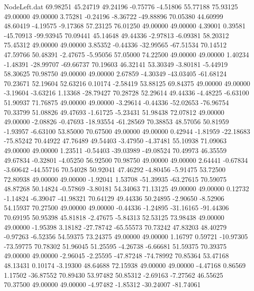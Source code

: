 \begin{filecontents}{NodeLeft.dat}
  69.98251   45.24719   49.24196    -0.75776   -4.51806   55.77188   75.93125   49.00000   49.00000    3.75281   -0.24196   -8.36722  -49.88896
  70.05380   44.60999   48.60419    -4.19575   -9.17368   57.23125   76.01250   49.00000   49.00000    4.39001    0.39581  -45.70913  -99.93945
  70.09441   45.14648   49.44336    -2.97813   -6.09381   58.20312   75.45312   49.00000   49.00000    3.85352   -0.44336  -32.99565  -67.51534
  70.14512   47.59766   50.48391    -2.47675   -5.95056   57.05000   74.22500   49.00000   49.00000    1.40234   -1.48391  -28.99707  -69.66737
  70.19603   46.32141   53.30349    -3.80181   -5.44919   58.30625   70.98750   49.00000   49.00000    2.67859   -4.30349  -43.03405  -61.68124
  70.23671   52.19604   52.63216     0.10174   -2.58419   53.88125   69.84375   49.00000   49.00000   -3.19604   -3.63216    1.13368  -28.79427
  70.28728   52.29614   49.44336    -4.48225   -6.63100   51.90937   71.76875   49.00000   49.00000   -3.29614   -0.44336  -52.02653  -76.96754
  70.33799   51.08826   49.47693    -1.61725   -5.23431   51.98438   72.07812   49.00000   49.00000   -2.08826   -0.47693  -18.93554  -61.28569
  70.38853   48.57056   50.81959    -1.93957   -6.63100   53.85000   70.67500   49.00000   49.00000    0.42944   -1.81959  -22.18683  -75.85242
  70.44922   47.76489   49.54403    -3.47950   -4.37481   55.10938   71.09063   49.00000   49.00000    1.23511   -0.54403  -39.03989  -49.08524
  70.49973   46.35559   49.67834    -0.32801   -4.05250   56.92500   70.98750   49.00000   49.00000    2.64441   -0.67834   -3.60642  -44.55716
  70.54028   50.92041   47.46292    -4.80456   -5.91475   53.72500   72.80938   49.00000   49.00000   -1.92041    1.53708  -51.39935  -63.27615
  70.59075   48.87268   50.14824    -0.57869   -3.80181   54.34063   71.13125   49.00000   49.00000    0.12732   -1.14824   -6.39047  -41.98321
  70.64129   49.44336   50.24895    -2.90650   -8.52906   54.15937   70.27500   49.00000   49.00000   -0.44336   -1.24895  -31.16165  -91.44306
  70.69195   50.95398   45.81818    -2.47675   -5.84313   52.53125   73.98438   49.00000   49.00000   -1.95398    3.18182  -27.78742  -65.55573
  70.73242   47.83203   48.40279    -0.97263   -6.52356   54.59375   73.24375   49.00000   49.00000    1.16797    0.59721  -10.97305  -73.59775
  70.78302   51.96045   51.25595    -4.26738   -6.66681   51.59375   70.39375   49.00000   49.00000   -2.96045   -2.25595  -47.87248  -74.78992
  70.85364   53.47168   48.13431     0.10174   -3.19300   48.64688   72.15938   49.00000   49.00000   -4.47168    0.86569    1.17502  -36.87552
  70.89430   53.97482   50.85312    -2.69163   -7.27562   46.55625   70.37500   49.00000   49.00000   -4.97482   -1.85312  -30.24007  -81.74061

\end{filecontents}
